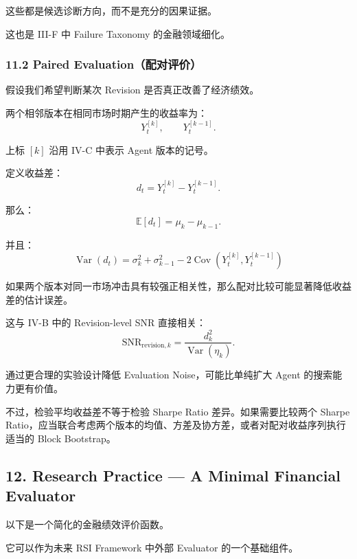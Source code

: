 这些都是候选诊断方向，而不是充分的因果证据。

这也是 III-F 中 Failure Taxonomy 的金融领域细化。

\hypertarget{part-4-67-0001-paired-evaluationux914dux5bf9ux8bc4ux4ef7}{%
\subsubsection{11.2 Paired Evaluation（配对评价）}\label{part-4-67-0001-paired-evaluationux914dux5bf9ux8bc4ux4ef7}}

假设我们希望判断某次 Revision 是否真正改善了经济绩效。

两个相邻版本在相同市场时期产生的收益率为：
\[Y_t^{[k]},
\qquad
Y_t^{[k-1]}.\]

上标 \([k]\) 沿用 IV-C 中表示 Agent 版本的记号。

定义收益差：
\[d_t=
Y_t^{[k]}-Y_t^{[k-1]}.\]

那么：
\[\mathbb E[d_t]
=
\mu_k-\mu_{k-1}.\]

并且：
\[\boxed{
\operatorname{Var}(d_t)
=
\sigma_k^2+\sigma_{k-1}^2
-
2\operatorname{Cov}
(Y_t^{[k]},Y_t^{[k-1]})
}\]

如果两个版本对同一市场冲击具有较强正相关性，那么配对比较可能显著降低收益差的估计误差。

这与 IV-B 中的 Revision-level SNR 直接相关：
\[\mathrm{SNR}_{\mathrm{revision},k}
=
\frac{d_k^2}{\operatorname{Var}(\eta_k)}.\]

通过更合理的实验设计降低 Evaluation Noise，可能比单纯扩大 Agent 的搜索能力更有价值。

不过，检验平均收益差不等于检验 Sharpe Ratio 差异。如果需要比较两个 Sharpe Ratio，应当联合考虑两个版本的均值、方差及协方差，或者对配对收益序列执行适当的 Block Bootstrap。

\hypertarget{part-4-67-0001-research-practice-a-minimal-financial-evaluator}{%
\subsection{12. Research Practice --- A Minimal Financial Evaluator}\label{part-4-67-0001-research-practice-a-minimal-financial-evaluator}}

以下是一个简化的金融绩效评价函数。

它可以作为未来 RSI Framework 中外部 Evaluator 的一个基础组件。

